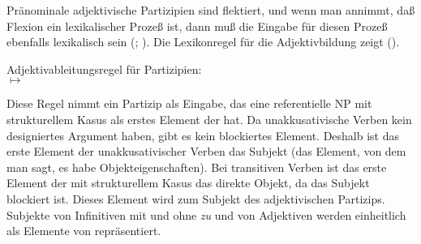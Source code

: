 {Pränominale adjektivische Partizipien sind flektiert, und
wenn man annimmt, daß Flexion ein lexikalischer Prozeß ist, dann muß die Eingabe
für diesen Prozeß ebenfalls lexikalisch sein (\citealp[]{Dowty78a};
\citealp[]{Bresnan82a}).
%
Die Lexikonregel für die Adjektivbildung zeigt ().

\eas
\label{lr-adjective-formation-da-approach}
Adjektivableitungsregel für Partizipien:\\
%
%
 $\mapsto$\\
\zs

\noindent
Diese Regel nimmt ein Partizip als Eingabe, das eine referentielle NP mit strukturellem
Kasus als erstes Element der \subcatl hat. Da unakkusativische Verben kein designiertes
Argument haben, gibt es kein blockiertes Element. Deshalb ist das erste
Element der \subcatl unakkusativischer Verben das Subjekt (das Element, von dem
man sagt, es habe Objekteigenschaften). Bei transitiven Verben ist das
erste Element der \subcatl mit strukturellem Kasus das direkte Objekt, da das Subjekt
blockiert ist. Dieses Element wird zum Subjekt des adjektivischen Partizips.
Subjekte von Infinitiven mit und ohne \emph{zu} und von Adjektiven werden
einheitlich als Elemente von \subj repräsentiert. 

}
